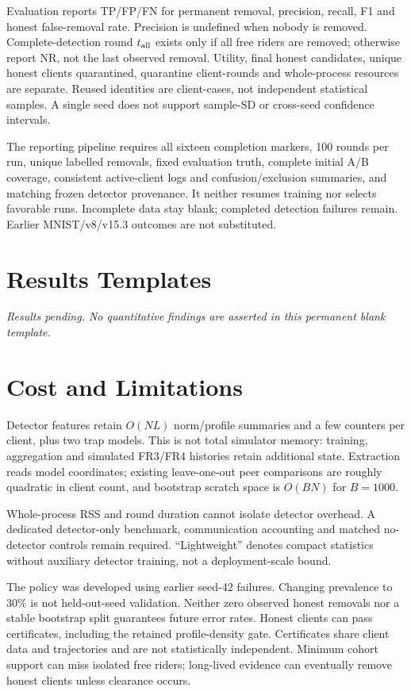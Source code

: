 \documentclass[conference]{IEEEtran}
\begin{document}
Evaluation reports TP/FP/FN for permanent removal, precision, recall, F1 and
honest false-removal rate. Precision is undefined when nobody is removed.
Complete-detection round $t_{\rm all}$ exists only if all free riders are removed;
otherwise report NR, not the last observed removal. Utility, final honest
candidates, unique honest clients quarantined, quarantine client-rounds and
whole-process resources are separate. Reused identities are client-cases, not
independent statistical samples. A single seed does not support sample-SD or
cross-seed confidence intervals.

The reporting pipeline requires all sixteen completion markers, 100 rounds per
run, unique labelled removals, fixed evaluation truth, complete initial A/B
coverage, consistent active-client logs and confusion/exclusion summaries, and
matching frozen detector provenance. It neither resumes training nor selects
favorable runs. Incomplete data stay blank; completed detection failures remain.
Earlier MNIST/v8/v15.3 outcomes are not substituted.

\section{Results Templates}
\ifpaperresults



\else
\textit{Results pending. No quantitative findings are asserted in this permanent
blank template.}


\fi
\FloatBarrier

\section{Cost and Limitations}
Detector features retain $O(NL)$ norm/profile summaries and a few counters per
client, plus two trap models. This is not total simulator memory: training,
aggregation and simulated FR3/FR4 histories retain additional state. Extraction
reads model coordinates; existing leave-one-out peer comparisons are roughly
quadratic in client count, and bootstrap scratch space is $O(BN)$ for $B=1000$.

Whole-process RSS and round duration cannot isolate detector overhead. A
dedicated detector-only benchmark, communication accounting and matched
no-detector controls remain required. ``Lightweight'' denotes compact
statistics without auxiliary detector training, not a deployment-scale bound.

The policy was developed using earlier seed-42 failures. Changing prevalence
to 30\% is not held-out-seed validation. Neither zero observed honest removals
nor a stable bootstrap split guarantees future error rates. Honest clients can
pass certificates, including the retained profile-density gate. Certificates
share client data and trajectories and are not statistically independent.
Minimum cohort support can miss isolated free riders; long-lived evidence can
eventually remove honest clients unless clearance occurs.
\end{document}
